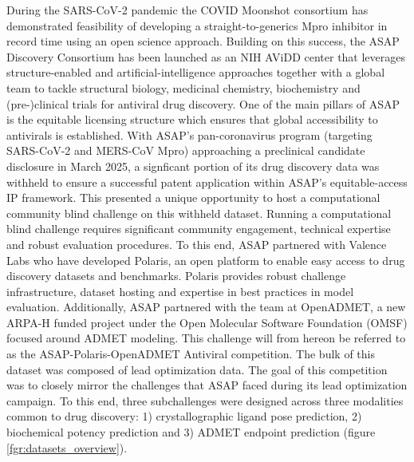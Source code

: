 \documentclass[journal=jacsat,manuscript=article]{achemso}
\begin{document}
During the SARS-CoV-2 pandemic the COVID Moonshot consortium has demonstrated feasibility of developing a straight-to-generics Mpro inhibitor in record time using an open science approach. Building on this success, the ASAP Discovery Consortium  has been launched as an NIH AViDD center that leverages structure-enabled and artificial-intelligence approaches together with a global team to tackle structural biology, medicinal chemistry, biochemistry and (pre-)clinical trials for antiviral drug discovery. One of the main pillars of ASAP is the equitable licensing structure which ensures that global accessibility to antivirals is established. With ASAP's pan-coronavirus program (targeting SARS-CoV-2 and MERS-CoV Mpro) approaching a preclinical candidate disclosure in March 2025, a signficant portion of its drug discovery data was withheld to ensure a successful patent application within ASAP's equitable-access IP framework. This presented a unique opportunity to host a computational community blind challenge on this withheld dataset. 
Running a computational blind challenge requires significant community engagement, technical expertise and robust evaluation procedures. To this end, ASAP partnered with Valence Labs who have developed Polaris, an open platform to enable easy access to drug discovery datasets and benchmarks. Polaris provides robust challenge infrastructure, dataset hosting and expertise in best practices in model evaluation. Additionally, ASAP partnered with the team at OpenADMET, a new ARPA-H funded project under the Open Molecular Software Foundation (OMSF) focused around ADMET modeling. This challenge will from hereon be referred to as the ASAP-Polaris-OpenADMET Antiviral competition. 
The bulk of this dataset was composed of lead optimization data. The goal of this competition was to closely mirror the challenges that ASAP faced during its lead optimization campaign. To this end, three subchallenges were designed across three modalities common to drug discovery: 1) crystallographic ligand pose prediction, 2) biochemical potency prediction and 3) ADMET endpoint prediction (figure \ref{fgr:datasets_overview}).
\end{document}
